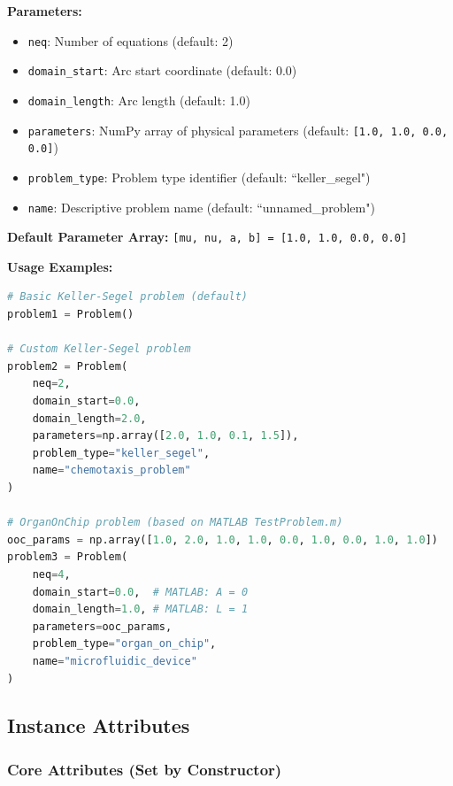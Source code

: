 \textbf{Parameters:}
\begin{itemize}
    \item \texttt{neq}: Number of equations (default: 2)
    \item \texttt{domain\_start}: Arc start coordinate (default: 0.0)
    \item \texttt{domain\_length}: Arc length (default: 1.0)
    \item \texttt{parameters}: NumPy array of physical parameters (default: \texttt{[1.0, 1.0, 0.0, 0.0]})
    \item \texttt{problem\_type}: Problem type identifier (default: ``keller\_segel")
    \item \texttt{name}: Descriptive problem name (default: ``unnamed\_problem")
\end{itemize}

\textbf{Default Parameter Array:} \texttt{[mu, nu, a, b] = [1.0, 1.0, 0.0, 0.0]}

\textbf{Usage Examples:}
\begin{lstlisting}[language=Python, caption=Constructor Usage Examples]
# Basic Keller-Segel problem (default)
problem1 = Problem()

# Custom Keller-Segel problem
problem2 = Problem(
    neq=2,
    domain_start=0.0,
    domain_length=2.0,
    parameters=np.array([2.0, 1.0, 0.1, 1.5]),
    problem_type="keller_segel",
    name="chemotaxis_problem"
)

# OrganOnChip problem (based on MATLAB TestProblem.m)
ooc_params = np.array([1.0, 2.0, 1.0, 1.0, 0.0, 1.0, 0.0, 1.0, 1.0])
problem3 = Problem(
    neq=4,
    domain_start=0.0,  # MATLAB: A = 0
    domain_length=1.0, # MATLAB: L = 1
    parameters=ooc_params,
    problem_type="organ_on_chip",
    name="microfluidic_device"
)
\end{lstlisting}

\subsection{Instance Attributes}
\label{subsec:instance_attributes}

\subsubsection{Core Attributes (Set by Constructor)}

